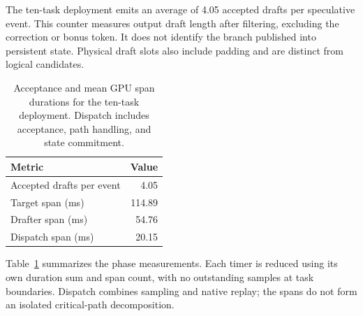 The ten-task deployment emits an average of 4.05 accepted drafts per speculative event. This counter measures output draft length after filtering, excluding the correction or bonus token. It does not identify the branch published into persistent state. Physical draft slots also include padding and are distinct from logical candidates.

\begin{table}[t]
\caption{Acceptance and mean GPU span durations for the ten-task deployment. Dispatch includes acceptance, path handling, and state commitment.}
\label{tab:recovered-telemetry}
\centering\small
\begin{tabular}{@{}lr@{}}
\toprule
Metric & Value \\
\midrule
Accepted drafts per event & 4.05 \\
Target span (ms) & 114.89 \\
Drafter span (ms) & 54.76 \\
Dispatch span (ms) & 20.15 \\
\bottomrule
\end{tabular}
\end{table}

Table~\ref{tab:recovered-telemetry} summarizes the phase measurements. Each timer is reduced using its own duration sum and span count, with no outstanding samples at task boundaries. Dispatch combines sampling and native replay; the spans do not form an isolated critical-path decomposition.
